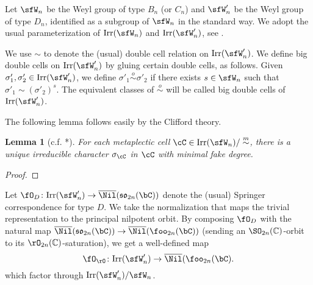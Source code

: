 \documentclass[12pt,a4paper]{amsart}
\def\fsp{\mathfrak{sp}}
\def\fso{\mathfrak{so}}
\numberwithin{equation}{section}
\newtheorem{lem}[thm]{Lemma}
\theoremstyle{remark}
\def\tdLS{\tilde{\mathrm{d}}_{\mathrm{LS}}}
\def\tdSP{\tilde{\mathrm{d}}_{\mathrm{SP}}}
\begin{document}
\def\msim{\stackrel{m}{\sim}}
\def\osim{\stackrel{o}{\sim}}

\def\Irr{\mathrm{Irr}}
\def\bNil{\overline{\Nil}}
\def\bNilsp{\overline{\Nil}^{\mathrm{sp}}}
\def\bNilSP{\bNil(\fsp_{2n}(\bC))}

\def\Irrms{\Irr^{\mathrm{ms}}}
\def\Irrsp{\Irr^{\mathrm{sp}}}

\def\tdLS{\tilde{\mathrm d}_{\mathrm{LS}}}
\def\tdSP{\tilde{\mathrm d}_{\mathrm{SP}}}

\def\Springer{\fO}
\def\SpringerD{\fO_D}
\def\SpringerO{\fO_{\rO}}
\def\bSpringerO{\overline{\fO}_{\rO}}
\def\RSp{\fR_C}
\def\RRD{\fR_D}

\def\cuprow{\stackrel{r}{\sqcup}}
\def\cupcol{\stackrel{c}{\sqcup}}

Let $\sfW_{n}$ be the Weyl group of type $B_n$ (or $C_{n}$) and $\sfW'_{n}$ be the Weyl
group of type $D_{n}$, identified as a subgroup of $\sfW_{n}$ in the standard way.
We adopt the usual parameterization of $\Irr(\sfW_{n})$ and $\Irr(\sfW'_{n})$,
see \cite{Carter}.

We use $\sim$ to denote the (usual) double cell relation on $\Irr(\sfW'_{n})$.
We define big double cells on $\Irr(\sfW'_{n})$ by gluing certain double cells, as follows.
Given $\sigma'_{1}, \sigma'_{2} \in \Irr(\sfW'_{n})$, we define $\sigma'_{1}\osim \sigma'_{2}$ if there exists $s\in \sfW_{n}$ such that
$\sigma'_{1}\sim (\sigma'_{2})^{s}$.
The equivalent classes of $\osim$ will be called big double cells of $\Irr(\sfW'_{n})$.


The following lemma follows easily by the Clifford theory.


\begin{lem}[c.f. {\cite{BV2}*{}}]
  For each metaplectic cell $\cC \in \Irr(\sfW_{n})/\msim$, there is a unique
  irreducible character $\sigma_{\cC}$ in $\cC$ with minimal fake degree.
\end{lem}
\begin{proof}

\end{proof}

Let $\SpringerD\colon \Irr(\sfW'_{n}) \rightarrow  \bNil(\fso_{2n}(\bC))$ denote
the (usual) Springer correspondence for type $D$. We take the normalization
that maps the trivial representation to the principal nilpotent orbit.
By composing $\SpringerD$ with the natural map
$\bNil(\fso_{2n}(\bC))\rightarrow \bNil(\foo_{2n}(\bC))$ (sending an $\SO_{2n}(\C)$-orbit to its
$\rO_{2n}(\C)$-saturation),
we get a well-defined map
\[
\SpringerO\colon  \Irr(\sfW'_{n}) \rightarrow  \bNil(\foo_{2n}(\bC).
\]
which factor through $\Irr(\sfW'_{n})/\sfW_{n}$.
\end{document}
